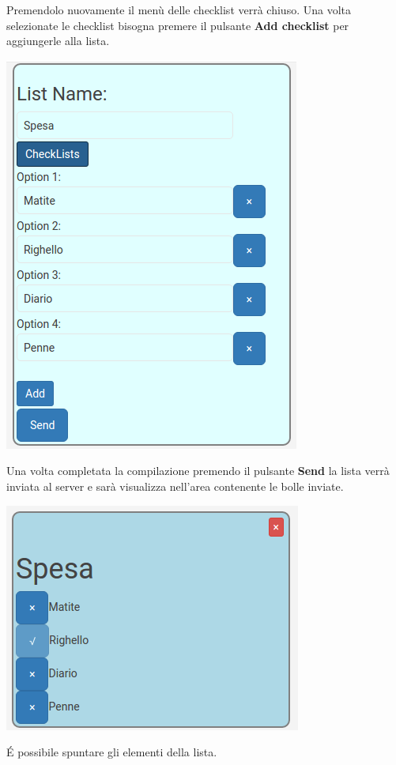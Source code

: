 \begin{flushleft}
Premendolo nuovamente il menù delle checklist verrà chiuso.
Una volta selezionate le checklist bisogna premere il pulsante \textbf{Add checklist} per aggiungerle alla lista.\\
\begin{center}
\includegraphics[scale=0.65]{img/list_checklist2.png}
\end{center}

Una volta completata la compilazione premendo il pulsante \textbf{Send} la lista verrà inviata al server e sarà visualizza nell'area contenente le bolle inviate.

\begin{center}
	\includegraphics[scale=0.70]{img/list_checklist.png}
\end{center}

\'E possibile spuntare gli elementi della lista.

\end{flushleft}

